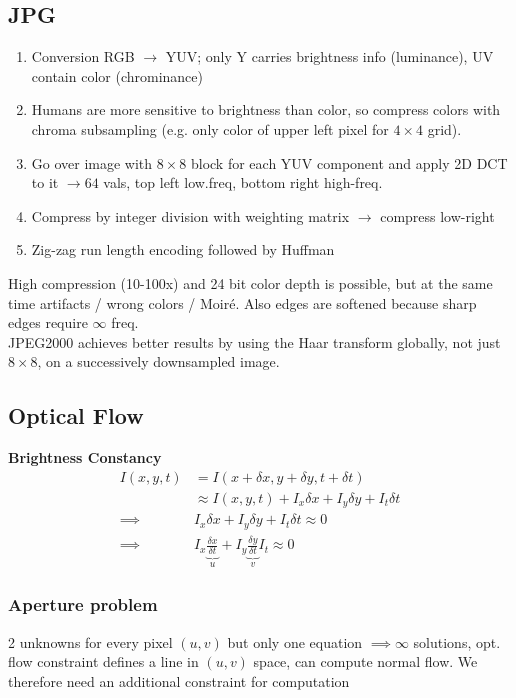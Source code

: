 \documentclass[a4paper,10pt]{article}
\begin{document}
\subsection{JPG}
\begin{enumerate}
    \item Conversion RGB \( \to \) YUV; only Y carries brightness info (luminance), UV contain color (chrominance)
    \item Humans are more sensitive to brightness than color, so compress colors with chroma subsampling (e.g. only color of upper left pixel for \( 4\times 4\) grid).
    \item Go over image with \( 8 \times 8 \) block for each YUV component and apply 2D DCT to it \( \rightarrow 64 \) vals, top left low.freq, bottom right high-freq.
    \item Compress by integer division with weighting matrix \( \rightarrow \) compress low-right
    \item Zig-zag run length encoding followed by Huffman
\end{enumerate}
High compression (10-100x) and 24 bit color depth is possible, but at the same time artifacts / wrong colors / Moiré. Also edges are softened because sharp edges require \( \infty \) freq.\\
JPEG2000 achieves better results by using the Haar transform globally, not just \( 8 \times 8 \), on a successively downsampled image.

\subsection{Optical Flow}
\textbf{Brightness Constancy}
\begin{align*}
    I(x,y,t) &= I(x+ \delta x, y + \delta y, t + \delta t) \\
	     &\approx I(x,y,t) + I_x \delta x + I_y \delta y + I_t \delta t \\
    \implies &I_x \delta x + I_y \delta y + I_t \delta t \approx 0 \\
    \implies &I_x \underbrace{\frac{\delta x}{\delta t}}_u + I_y \underbrace{\frac{\delta y}{\delta t}}_v I_t \approx 0
\end{align*}
\subsubsection{Aperture problem} 2 unknowns for every pixel \( (u,v) \) but only one equation \( \implies \infty\)  solutions, opt. flow constraint defines a line in \( (u,v) \) space, can compute normal flow. We therefore need an additional constraint for computation
\end{document}
